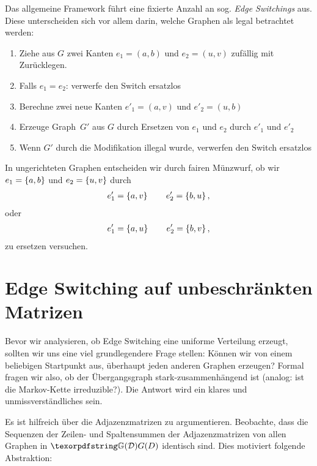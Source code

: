 Das  allgemeine Framework führt eine fixierte Anzahl an sog. \emph{Edge Switchings} aus.
Diese unterscheiden sich vor allem darin, welche Graphen als legal betrachtet werden:
\begin{enumerate}
    \item Ziehe aus $G$ zwei Kanten $e_1 = (a,b)$ und $e_2 = (u,v)$ zufällig mit Zurücklegen.
    \item Falls $e_1 = e_2$: verwerfe den Switch ersatzlos

    \item Berechne zwei neue Kanten $e'_1 = (a, v)$ und $e'_2 = (u, b)$

    \item Erzeuge Graph~$G'$ aus $G$ durch Ersetzen von $e_1$ und $e_2$ durch $e'_1$ und $e'_2$

    \item Wenn $G'$ durch die Modifikation illegal wurde, verwerfen den Switch ersatzlos
\end{enumerate}

In  ungerichteten Graphen entscheiden wir durch fairen Münzwurf, ob wir $e_1 = \left\{a,b\right\}$ und $e_2 = \left\{u, v\right\}$ durch
\begin{align}
    e'_1 = \left\{a, v\right\} \qquad e'_2 = \left\{b, u\right\},
\end{align}
oder
\begin{align}
    e'_1 = \left\{a, u\right\} \qquad e'_2 = \left\{b, v\right\},
\end{align}
zu ersetzen versuchen.

\section{Edge Switching auf unbeschränkten Matrizen}\label{sec:edge_switching_irreduzibel}
Bevor wir analysieren, ob Edge Switching eine uniforme Verteilung erzeugt, sollten wir uns eine viel grundlegendere Frage stellen:
Können wir von einem beliebigen Startpunkt aus, überhaupt jeden anderen Graphen erzeugen?
Formal fragen wir also, ob der Übergangsgraph stark-zusammenhängend ist (analog: ist die Markov-Kette irreduzible?).
Die Antwort wird ein klares und unmissverständliches  sein.

\bigskip

Es ist hilfreich über die Adjazenzmatrizen zu argumentieren.
Beobachte, dass die Sequenzen der Zeilen- und Spaltensummen der Adjazenzmatrizen von allen Graphen in $\gd$ identisch sind.
Dies motiviert folgende Abstraktion:

